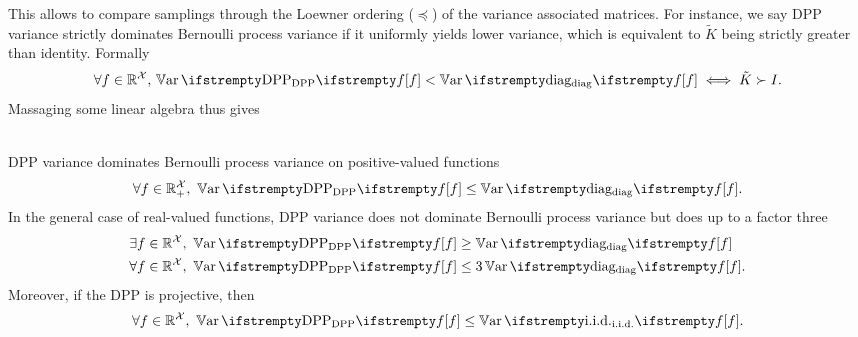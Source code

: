 This allows to compare samplings through the Loewner ordering ($\preceq$) of the variance associated matrices. For instance, we say DPP variance strictly dominates Bernoulli process variance if it uniformly yields lower variance, which is equivalent to $\tilde K$ being strictly greater than identity. Formally 
\begin{equation*}
	\forall \query \in \RR^{\mathcal{X}}, \, \Var{\textrm{DPP}}{f} < \Var{\textrm{diag}}{f} \iff \tilde K \succ I.
\end{equation*}
Massaging some linear algebra thus gives

\begin{tcolorbox}
	\begin{proposition}\ \\
		\label{prop__var_comp}
		DPP variance dominates Bernoulli process variance on positive-valued functions
		\begin{align}
			\label{eqn__posvar}
			\forall \query \in \RR_+^{\mathcal{X}},\ \Var{\textrm{DPP}}{f} \leq \Var{\textrm{diag}}{f}.
		\end{align}
		In the general case of real-valued functions, DPP variance does not dominate Bernoulli process variance but does up to a factor three
		\begin{align}
			\label{eqn__nodom}
			&\exists \query \in \RR^{\mathcal{X}},\ \Var{\textrm{DPP}}{f} \geq \Var{\textrm{diag}}{f}\\
			\label{eqn__domtwo}
			&\forall \query \in \RR^{\mathcal{X}},\ \Var{\textrm{DPP}}{f} \leq 3\Var{\textrm{diag}}{f}.
		\end{align}
		Moreover, if the DPP is projective, then
		\begin{align}
			\label{eqn__projiid}
			\forall \query \in \RR^{\mathcal{X}},\ \Var{\textrm{DPP}}{f} \leq \Var{\textrm{i.i.d.}}{f}.
		\end{align}
	\end{proposition}
\end{tcolorbox}



